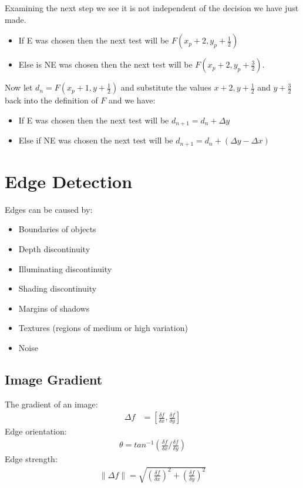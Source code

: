 \documentclass{article}
\begin{document}
Examining the next step we see it is not independent of the decision we have just made.
\begin{itemize}
	\item If E was chosen then the next test will be $F(x_p+2,y_p+\frac{1}{2})$
	\item Else is NE was chosen then the next test will be $F(x_p + 2, y_p + \frac{3}{2})$.
\end{itemize}
Now let $d_n = F(x_p + 1, y + \frac{1}{2})$ and substitute the values $x+2, y+\frac{1}{2}$ and $y+\frac{3}{2}$ back into the definition of $F$ and we have:
\begin{itemize}
	\item If E was chosen then the next test will be $d_{n+1} = d_n+\Delta y$
	\item Else if NE was chosen the next test will be $d_{n+1} = d_n + (\Delta y - \Delta x)$
\end{itemize}

\section{Edge Detection}
Edges can be caused by:
\begin{itemize}
	\item Boundaries of objects
	\item Depth discontinuity
	\item Illuminating discontinuity
	\item Shading discontinuity
	\item Margins of shadows
	\item Textures (regions of medium or high variation)
	\item Noise 
\end{itemize} 

\subsection{Image Gradient}
The gradient of an image:
\begin{align*}
	\Delta f &= [\frac{\delta f}{\delta x},\frac{\delta f}{\delta y}]
\end{align*}
Edge orientation:
\begin{align*}
	\theta = tan^{-1}(\frac{\delta f}{\delta x}/\frac{\delta f}{\delta y})
\end{align*}
Edge strength:
\begin{align*}
	\|\Delta f\| = \sqrt{(\frac{\delta f}{\delta x})^2+(\frac{\delta f}{\delta y})^2}
\end{align*}
\end{document}
